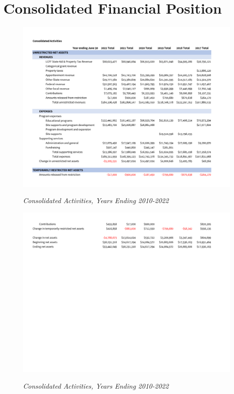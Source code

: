 
\chapter{Consolidated Financial Position}\label{ch:consolidated_financial_position}
\begin{figure}[hbt]
    \caption[Consolidated Financial Position, Years Ending 2010–2022]{\textit{Consolidated Activities, Years Ending 2010-2022}}\label{fig:consolidated_activities_2010-2022} %
    \includegraphics[width=\textwidth]{Consolidated Financial Statements/v5 Spreadsheets/Consolidated_Activities_Years_2010-2022 PDF pages/.pg_0001}\\ %
\end{figure}
\begin{figure}[hbt]
    \caption[Consolidated Activities, Years Ending 2010–2022]{\textit{Consolidated Activities, Years Ending 2010-2022}}\label{fig:consolidated_activities_2010-2022} %
    \includegraphics[width=\textwidth]{Consolidated Financial Statements/v5 Spreadsheets/Consolidated_Activities_Years_2010-2022 PDF pages/.pg_0002}\\ %
\end{figure}
